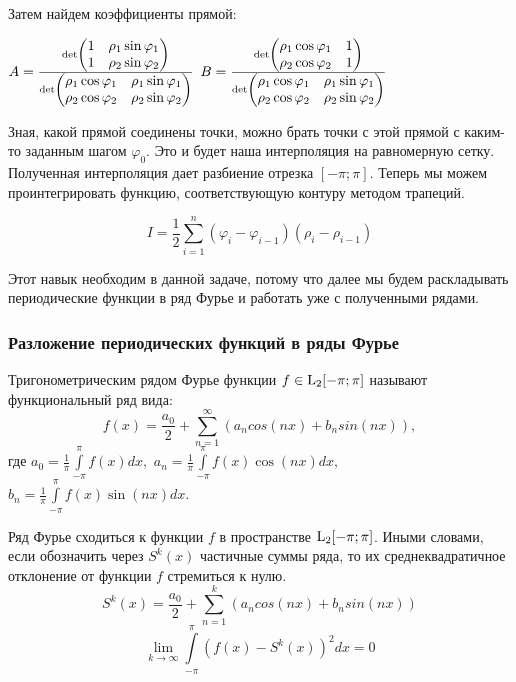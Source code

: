 \documentclass[a4paper,12pt, titlepage]{article}
\begin{document}
Затем найдем коэффициенты прямой:
\begin{center}
$A = 
\frac
{{\rm det} \begin{pmatrix} 1 & {\rho}_{1}\sin{\varphi}_{1} \\ 1 & {\rho}_{2}\sin{\varphi}_{2} \end{pmatrix} }
{{\rm det} \begin{pmatrix} {\rho}_{1}\cos{\varphi}_{1} & {\rho}_{1}\sin{\varphi}_{1} \\ {\rho}_{2}\cos{\varphi}_{2} & {\rho}_{2}\sin{\varphi}_{2} \end{pmatrix} }
$
$B = 
\frac
{{\rm det} \begin{pmatrix}  {\rho}_{1}\cos{\varphi}_{1}  & 1\\  {\rho}_{2}\cos{\varphi}_{2} & 1\end{pmatrix} }
{{\rm det} \begin{pmatrix} {\rho}_{1}\cos{\varphi}_{1} & {\rho}_{1}\sin{\varphi}_{1} \\ {\rho}_{2}\cos{\varphi}_{2} & {\rho}_{2}\sin{\varphi}_{2} \end{pmatrix} }
$
\end{center}

Зная, какой прямой соединены точки, можно брать точки с этой прямой с каким-то заданным шагом ${\varphi}_{0}$.  Это и будет наша 
интерполяция на равномерную сетку. Полученная интерполяция дает разбиение отрезка $[-\pi;\pi]$. Теперь мы можем проинтегрировать 
функцию, соответствующую контуру методом трапеций.

$$I = \frac{1}{2}\sum_{i=1}^{n}({\varphi}_{i}-{\varphi}_{i-1})({\rho}_{i}-{\rho}_{i-1})$$

Этот навык необходим в данной задаче, потому что далее мы будем раскладывать периодические функции в ряд Фурье и работать уже с 
полученными рядами.

\subsubsection{Разложение периодических функций в ряды Фурье}
Тригонометрическим рядом Фурье функции $f\in{\rm L}_{2}[-\pi;\pi]$ называют функциональный ряд вида:
$$f(x)= \frac{{a}_{0}}{2} + \sum\limits_{n=1}^{\infty} ({a}_{n}cos(nx)+{b}_{n}sin(nx)),$$     где
${a}_{0}= \frac{1}{\pi} \int\limits_{-\pi}^{\pi}f(x)dx,$
${a}_{n} = \frac{1}{\pi} \int\limits_{-\pi}^{\pi}f(x)\cos(nx)dx,$
${b}_{n} = \frac{1}{\pi} \int\limits_{-\pi}^{\pi}f(x)\sin(nx)dx.$

Ряд  Фурье сходиться к функции $f$ в пространстве   ${\rm L}_{2}[-\pi;\pi]$. Иными словами, если обозначить  через  ${S}^{k}(x)$ частичные суммы ряда, то их среднеквадратичное  отклонение от функции $f$ стремиться к нулю.
$${S}^{k}(x) = \frac{{a}_{0}}{2} + \sum\limits_{n=1}^{k} ({a}_{n}cos(nx)+{b}_{n}sin(nx))$$
$$\lim_{k \to \infty} \int\limits_{-\pi}^{\pi}(f(x)-S^{k}(x))^{2}dx = 0$$
\end{document}
